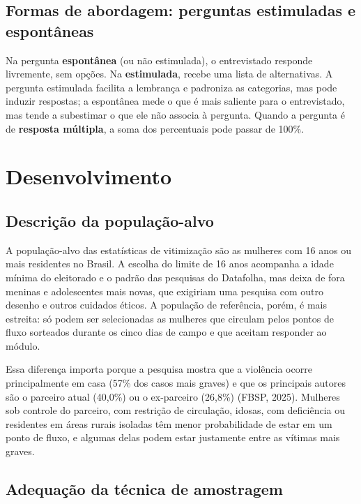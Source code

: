 \documentclass[12pt,a4paper]{article}
\begin{document}
\subsection{Formas de abordagem: perguntas estimuladas e espontâneas}

Na pergunta \textbf{espontânea} (ou não estimulada), o entrevistado responde livremente, sem opções. Na \textbf{estimulada}, recebe uma lista de alternativas. A pergunta estimulada facilita a lembrança e padroniza as categorias, mas pode induzir respostas; a espontânea mede o que é mais saliente para o entrevistado, mas tende a subestimar o que ele não associa à pergunta. Quando a pergunta é de \textbf{resposta múltipla}, a soma dos percentuais pode passar de 100\%.

\newpage

\section{Desenvolvimento}

\subsection{Descrição da população-alvo}

A população-alvo das estatísticas de vitimização são as mulheres com 16 anos ou mais residentes no Brasil. A escolha do limite de 16 anos acompanha a idade mínima do eleitorado e o padrão das pesquisas do Datafolha, mas deixa de fora meninas e adolescentes mais novas, que exigiriam uma pesquisa com outro desenho e outros cuidados éticos. A população de referência, porém, é mais estreita: só podem ser selecionadas as mulheres que circulam pelos pontos de fluxo sorteados durante os cinco dias de campo e que aceitam responder ao módulo.

Essa diferença importa porque a pesquisa mostra que a violência ocorre principalmente em casa (57\% dos casos mais graves) e que os principais autores são o parceiro atual (40,0\%) ou o ex-parceiro (26,8\%) (FBSP, 2025). Mulheres sob controle do parceiro, com restrição de circulação, idosas, com deficiência ou residentes em áreas rurais isoladas têm menor probabilidade de estar em um ponto de fluxo, e algumas delas podem estar justamente entre as vítimas mais graves.

\subsection{Adequação da técnica de amostragem}
\label{sec:adequacao}
\end{document}
